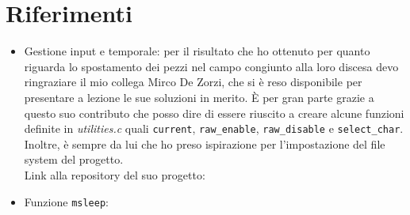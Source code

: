 \documentclass[a4paper]{article}
\begin{document}
\section{Riferimenti}
\begin{itemize}
	\item Gestione input e temporale: per il risultato che ho ottenuto per quanto riguarda lo spostamento dei pezzi nel campo congiunto alla loro discesa devo ringraziare il mio collega Mirco De Zorzi, che si è reso disponibile per presentare a lezione le sue soluzioni in merito. È per gran parte grazie a questo suo contributo che posso dire di essere riuscito a creare alcune funzioni definite in \textit{utilities.c} quali \texttt{current}, \texttt{raw_enable}, \texttt{raw_disable} e \texttt{select_char}.\\
	Inoltre, è sempre da lui che ho preso ispirazione per l'impostazione del file system del progetto.\\
	Link alla repository del suo progetto: \microdezorzi
	\item Funzione \texttt{msleep}: \msleepurl
\end{itemize}
\end{document}
